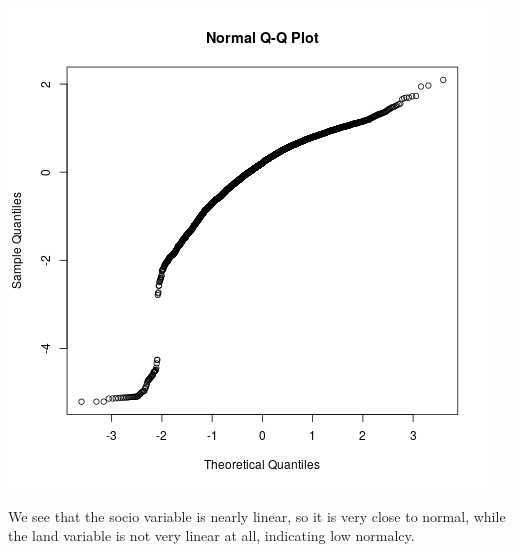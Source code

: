 \documentclass[letterpaper,10pt]{article}
\begin{document}
\begin{enumerate}
\begin{enumerate}
\begin{center}
\includegraphics[scale=.5]{lowqq.png}
\end{center}
We see that the socio variable is nearly linear, so it is very close to normal, while the land variable is not very linear at all, indicating low normalcy.
\end{enumerate}
\end{enumerate}
\end{document}
